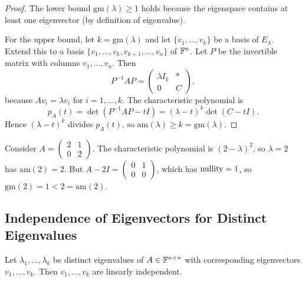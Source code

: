 \documentclass[11pt,a4paper]{article}
\begin{document}
\begin{proof}
The lower bound $\mathrm{gm}(\lambda) \geq 1$ holds because the
eigenspace contains at least one eigenvector (by definition of eigenvalue).

For the upper bound, let $k = \mathrm{gm}(\lambda)$ and let
$\{v_1, \ldots, v_k\}$ be a basis of $E_\lambda$.  Extend this to a basis
$\{v_1, \ldots, v_k, v_{k+1}, \ldots, v_n\}$ of $\mathbb{F}^n$.  Let $P$ be the
invertible matrix with columns $v_1, \ldots, v_n$.  Then
\[
  P^{-1}AP = \begin{pmatrix} \lambda I_k & * \\ 0 & C \end{pmatrix},
\]
because $Av_i = \lambda v_i$ for $i = 1, \ldots, k$.  The characteristic
polynomial is
\[
  p_A(t) = \det(P^{-1}AP - tI)
  = (\lambda - t)^k \det(C - tI).
\]
Hence $(\lambda - t)^k$ divides $p_A(t)$, so
$\mathrm{am}(\lambda) \geq k = \mathrm{gm}(\lambda)$.
\end{proof}

\begin{example}
\label{ex:strict_mult}
Consider $A = \begin{pmatrix} 2 & 1 \\ 0 & 2 \end{pmatrix}$.  The
characteristic polynomial is $(2 - \lambda)^2$, so $\lambda = 2$ has
$\mathrm{am}(2) = 2$.  But $A - 2I = \begin{pmatrix} 0 & 1 \\ 0 & 0 \end{pmatrix}$,
which has $\operatorname{nullity} = 1$, so $\mathrm{gm}(2) = 1 < 2 = \mathrm{am}(2)$.
\end{example}

\subsection{Independence of Eigenvectors for Distinct Eigenvalues}

\begin{theorem}
\label{thm:distinct_eigen_indep}
Let $\lambda_1, \ldots, \lambda_k$ be distinct eigenvalues of
$A \in \mathbb{F}^{n \times n}$ with corresponding eigenvectors $v_1, \ldots, v_k$.
Then $v_1, \ldots, v_k$ are linearly independent.
\end{theorem}
\end{document}
